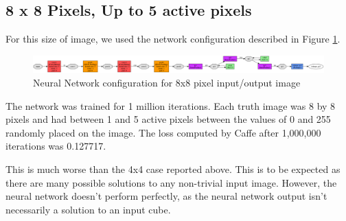 \documentclass[twoside]{article}
\begin{document}
\subsection{8 x 8 Pixels, Up to 5 active pixels}

For this size of image, we used the network configuration described in Figure \ref{net8x8}.

    \begin{figure}[H]
      
      \centering
        \includegraphics[width=\textwidth]{images/8x8/minnd_dia}
        \caption{Neural Network configuration for 8x8 pixel input/output image}
        \label{net8x8}
    \end{figure}
  The network was trained for 1 million iterations. Each truth image was 8 by 8 pixels and had between 1 and 5 active pixels between the values of 0 and 255 randomly placed on the image. The loss computed by Caffe after 1,000,000 iterations was 0.127717. \par This is much worse than the 4x4 case reported above. This is to be expected as there are many possible solutions to any non-trivial input image. However, the neural network doesn't perform perfectly, as the neural network output isn't necessarily a solution to an input cube.
\end{document}
